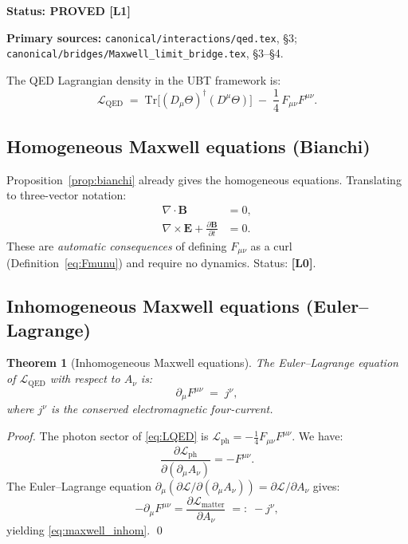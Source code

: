 \documentclass[11pt,a4paper]{article}
\newtheorem{theorem}{Theorem}
\newcommand{\Lzero}{\textbf{[L0]}}
\newcommand{\Lone}{\textbf{[L1]}}
\newcommand{\PROVED}{\textbf{PROVED}}
\begin{document}
\noindent\textbf{Status: \PROVED{} \Lone}

\noindent\textbf{Primary sources:}
\texttt{canonical/interactions/qed.tex}, \S3;
\texttt{canonical/bridges/Maxwell\_limit\_bridge.tex}, \S3--\S4.

\medskip

The QED Lagrangian density in the UBT framework is:
\begin{equation}\label{eq:LQED}
  \mathcal{L}_{\mathrm{QED}}
  \;=\;
  \mathrm{Tr}\bigl[(D_\mu\Theta)^\dagger(D^\mu\Theta)\bigr]
  \;-\;
  \frac{1}{4}\,F_{\mu\nu}F^{\mu\nu}.
\end{equation}

\subsection{Homogeneous Maxwell equations (Bianchi)}

Proposition~\ref{prop:bianchi} already gives the homogeneous equations.
Translating to three-vector notation:
\begin{align}
  \nabla\cdot\mathbf{B} &= 0, \label{eq:max1} \\
  \nabla\times\mathbf{E} + \frac{\partial\mathbf{B}}{\partial t} &= 0. \label{eq:max2}
\end{align}
These are \emph{automatic consequences} of defining $F_{\mu\nu}$ as a
curl (Definition~\ref{eq:Fmunu}) and require no dynamics. Status: \Lzero.

\subsection{Inhomogeneous Maxwell equations (Euler--Lagrange)}

\begin{theorem}[Inhomogeneous Maxwell equations]
\label{thm:maxwell_inhom}
The Euler--Lagrange equation of $\mathcal{L}_{\mathrm{QED}}$
with respect to $A_\nu$ is:
\begin{equation}\label{eq:maxwell_inhom}
  \partial_\mu F^{\mu\nu} \;=\; j^\nu,
\end{equation}
where $j^\nu$ is the conserved electromagnetic four-current.
\end{theorem}

\begin{proof}
The photon sector of \eqref{eq:LQED} is $\mathcal{L}_{\mathrm{ph}} = -\tfrac{1}{4}F_{\mu\nu}F^{\mu\nu}$.
We have:
\begin{equation}
  \frac{\partial\mathcal{L}_{\mathrm{ph}}}{\partial(\partial_\mu A_\nu)}
  = -F^{\mu\nu}.
\end{equation}
The Euler--Lagrange equation $\partial_\mu(\partial\mathcal{L}/\partial(\partial_\mu A_\nu)) = \partial\mathcal{L}/\partial A_\nu$
gives:
\begin{equation}
  -\partial_\mu F^{\mu\nu} = \frac{\partial\mathcal{L}_{\mathrm{matter}}}{\partial A_\nu}
  \;=:\; -j^\nu,
\end{equation}
yielding \eqref{eq:maxwell_inhom}. \qed
\end{proof}
\end{document}
